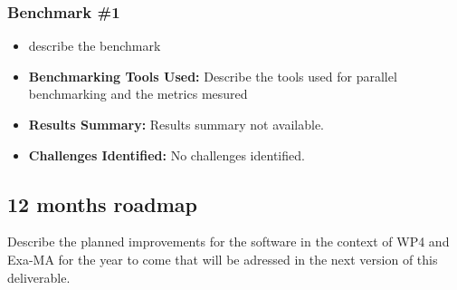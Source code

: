 \subsubsection{Benchmark \#1}
\begin{itemize}
    \item describe the benchmark
    \item \textbf{Benchmarking Tools Used:} Describe the tools used for parallel benchmarking and the metrics mesured
    \item \textbf{Results Summary:} Results summary not available.
    \item \textbf{Challenges Identified:} No challenges identified.
\end{itemize}

\subsection{12 months roadmap}
\label{sec:WP4:Feel++:roadmap}

Describe the planned improvements  for the software in the context of WP4 and Exa-MA for the year to come that will be adressed in the next version of this deliverable.